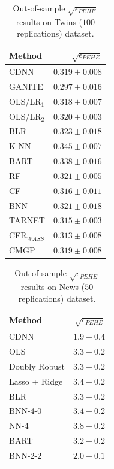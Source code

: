 \documentclass[sigconf]{acmart}
\theoremstyle{plain}
\numberwithin{equation}{section}
\begin{document}
\begin{center}
	\begin{table}[!h]
		\centering
		\caption{Out-of-sample $\sqrt{\epsilon_{PEHE}}$  results on Twins ($100$ replications) dataset. }
		\label{table:PEHE_Twins}
		\begin{tabular}{|l|r|}
			\hline
			Method &$\sqrt{\epsilon_{PEHE}}$\\ 
			\hline
			CDNN &    $0.319\pm0.008$ \\
			\hline
			GANITE&  $\bm{0.297}\pm0.016$\\
			OLS/LR$_1$ &   $0.318\pm0.007$\\
			OLS/LR$_2$ &  $0.320\pm0.003$\\
			BLR &     $0.323\pm0.018$\\
			K-NN &   $0.345\pm0.007$\\
			BART &   $0.338\pm0.016$\\
			RF &      $0.321\pm0.005$\\
			CF &      $0.316\pm0.011$\\
			BNN &       $0.321\pm0.018$ \\
			TARNET&       $0.315\pm0.003$\\
			CFR$_{W ASS}$&    $0.313\pm0.008$\\
			CMGP &        $0.319\pm0.008$ \\
			\hline			
		\end{tabular}
	\end{table}
\end{center}


\begin{center}
	\begin{table}[!h]
		\centering
		\caption{Out-of-sample $\sqrt{\epsilon_{PEHE}}$  results on News ($50$ replications) dataset. }
		\label{table:PEHE_News}
		\begin{tabular}{|l|r|}
			\hline
			Method  &$\sqrt{\epsilon_{PEHE}}$\\ 
			\hline
			CDNN   &  $\bm{1.9}\pm0.4$  \\
			\hline
			OLS &   $3.3\pm0.2$   \\
			Doubly Robust   &   $3.3\pm0.2$ \\
			Lasso + Ridge  &  $3.4\pm0.2$  \\
			BLR &    $3.3\pm0.2$  \\
			BNN-4-0   &  $3.4\pm0.2$  \\
			NN-4 &   $3.8\pm0.2$ \\
			BART &   $3.2\pm0.2$  \\
			BNN-2-2 & $2.0\pm0.1$  \\
			\hline			
		\end{tabular}
	\end{table}
\end{center}
\end{document}
